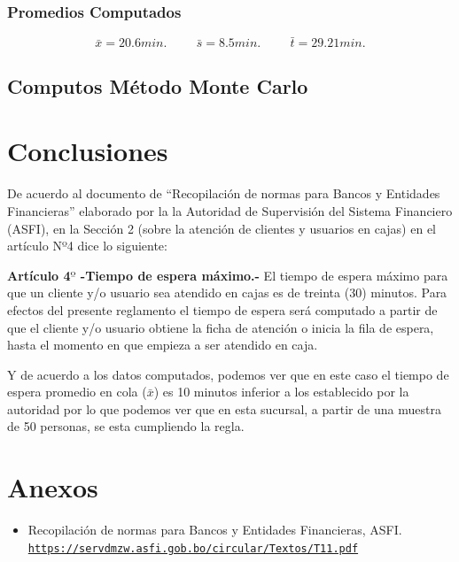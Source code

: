 \documentclass[10pt,letterpaper]{report}
\begin{document}
\subsubsection*{Promedios Computados}
$$
\bar{x}=20.6 min. \hspace{1cm} \bar{s}=8.5 min. \hspace{1cm}  \bar{t}=29.21 min.
$$
\subsection*{Computos Método Monte Carlo}


\section*{Conclusiones}
De acuerdo al documento de ``Recopilación de normas para Bancos y Entidades Financieras'' elaborado por la la Autoridad de Supervisión del Sistema Financiero (ASFI), en la Sección 2 (sobre la atención de clientes y usuarios en cajas) en el artículo Nº4 dice lo siguiente:
\begin{fminipage}{\textwidth}
\textbf{Artículo 4$º$ -Tiempo  de  espera  máximo.-} El tiempo  de  espera  máximo  para  que  un  cliente y/o usuario sea atendido en cajas es de treinta (30) minutos. Para efectos del presente reglamento el  tiempo de  espera será  computado  a  partir  de  que  el  cliente  y/o  usuario obtiene  la  ficha  de atención o inicia la fila de espera, hasta el momento en que empieza a ser atendido en caja.
\end{fminipage}
Y de acuerdo a los datos computados, podemos ver que en este caso el tiempo de espera promedio en cola ($\bar{x}$) es 10 minutos inferior a los establecido por la autoridad por lo que podemos ver que en esta sucursal, a partir de una muestra de 50 personas, se esta cumpliendo la regla.
\pagebreak
\section*{Anexos}
\begin{itemize}
\item Recopilación de normas para Bancos y Entidades Financieras, ASFI.\\ \href{https://servdmzw.asfi.gob.bo/circular/Textos/T11.pdf}{\texttt{https://servdmzw.asfi.gob.bo/circular/Textos/T11.pdf}}
\end{itemize}
\end{document}
